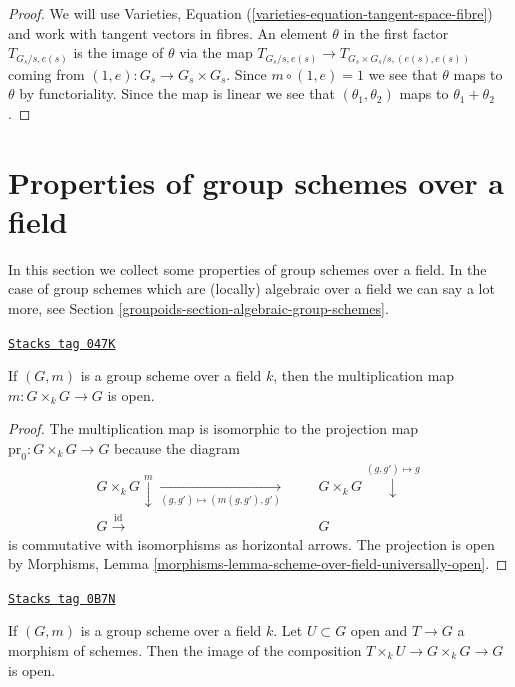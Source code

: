 \begin{proof}
We will use Varieties, Equation (\ref{varieties-equation-tangent-space-fibre})
and work with tangent vectors in fibres.
An element $\theta$ in the first factor $T_{G_s/s, e(s)}$
is the image of $\theta$ via the map
$T_{G_s/s, e(s)} \to T_{G_s \times G_s/s, (e(s), e(s))}$
coming from $(1, e) : G_s \to G_s \times G_s$.
Since $m \circ (1, e) = 1$ we see that $\theta$ maps to $\theta$
by functoriality. Since the map is linear we see that
$(\theta_1, \theta_2)$ maps to $\theta_1 + \theta_2$.
\end{proof}

\section{Properties of group schemes over a field}
\label{groupoids-section-properties-group-schemes-field}
In this section we collect some properties of group schemes over a
field. In the case of group schemes which are (locally) algebraic
over a field we can say a lot more, see
Section \ref{groupoids-section-algebraic-group-schemes}.

\begin{lemma}
\label{groupoids-lemma-group-scheme-over-field-open-multiplication}
\href{https://stacks.math.columbia.edu/tag/047K}{\texttt{Stacks tag 047K}}

If $(G, m)$ is a group scheme over a field $k$, then the
multiplication map $m : G \times_k G \to G$ is open.
\end{lemma}

\begin{proof}
The multiplication map is isomorphic to the projection map
$\text{pr}_0 : G \times_k G \to G$
because the diagram
$$
\begin{array}{cccc}G \times_k G \overset{m}{\downarrow}\underset{(g, g') \mapsto (m(g, g'), g')}{\longrightarrow} &  &  & G \times_k G \overset{(g, g') \mapsto g}{\downarrow} \\ G \overset{\text{id}}{\longrightarrow} &  &  & G\end{array}
$$
is commutative with isomorphisms as horizontal arrows. The projection
is open by
Morphisms, Lemma \ref{morphisms-lemma-scheme-over-field-universally-open}.
\end{proof}

\begin{lemma}
\label{groupoids-lemma-group-scheme-over-field-translate-open}
\href{https://stacks.math.columbia.edu/tag/0B7N}{\texttt{Stacks tag 0B7N}}

If $(G, m)$ is a group scheme over a field $k$. Let $U \subset G$
open and $T \to G$ a morphism of schemes. Then the image of the
composition $T \times_k U \to G \times_k G \to G$ is open.
\end{lemma}

